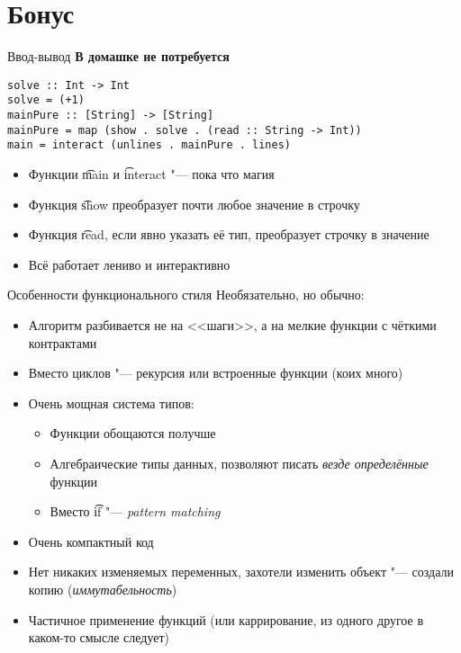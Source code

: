 \section{Бонус}

\begin{frame}
\end{frame}

\begin{frame}[fragile]{Ввод-вывод}
	\textbf{В домашке не потребуется}
\begin{verbatim}
solve :: Int -> Int
solve = (+1)
mainPure :: [String] -> [String]
mainPure = map (show . solve . (read :: String -> Int))
main = interact (unlines . mainPure . lines)
\end{verbatim}
	\begin{itemize}
		\item Функции \t{main} и \t{interact} "--- пока что магия
		\item Функция \t{show} преобразует почти любое значение в строчку
		\item Функция \t{read}, если явно указать её тип, преобразует строчку в значение
		\item Всё работает лениво и интерактивно
	\end{itemize}
\end{frame}

\begin{frame}{Особенности функционального стиля}
	Необязательно, но обычно:
	\begin{itemize}
		\item Алгоритм разбивается не на <<шаги>>, а на мелкие функции с чёткими контрактами
		\item Вместо циклов "--- рекурсия или встроенные функции (коих много)
		\item Очень мощная система типов:
			\begin{itemize}
				\item Функции обощаются получше
				\item Алгебраические типы данных, позволяют писать \textit{везде определённые} функции
				\item Вместо \t{if} "--- \textit{pattern matching}
			\end{itemize}
		\item Очень компактный код
		\item Нет никаких изменяемых переменных, захотели изменить объект "--- создали копию (\textit{иммутабельность})
		\item Частичное применение функций (или каррирование, из одного другое в каком-то смысле следует)
	\end{itemize}
\end{frame}

